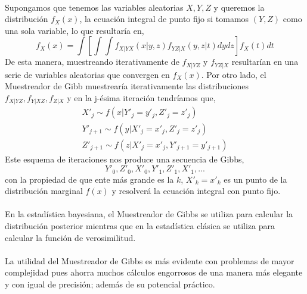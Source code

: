 \\
Supongamos que tenemos las variables aleatorias $X,Y,Z$ y queremos la distribuci\'on $f_X(x)$, la ecuaci\'on integral de punto fijo si tomamos $(Y,Z)$ como una sola variable, lo que resultar\'ia en,\\
\[f_X(x)= \int [ \int \int f_{X|YX}(x|y,z)f_{YZ|X}(y,z|t)dy dz] f_X(t) dt\]
De esta manera, muestreando iterativamente de $f_{X|YZ}$ y $f_{YZ|X}$ resultar\'ian en una serie de variables aleatorias que convergen en $f_X(x)$. Por otro lado, el Muestreador de Gibb muestrear\'ia iterativamente las distribuciones $f_{X|YZ}, f_{Y|XZ}, f_{Z|X}$ y en la j-\'esima iteraci\'on tendr\'iamos que,\\
\begin{align*}
X'_j \sim f(x|Y'_j = y'_j, Z'_j=z'_j)\\
Y'_{j+1} \sim f(y|X'_j=x'_j, Z'_j=z'_j)\\
Z'_{j+1} \sim f(z|X'_j=x'_j, Y'_{j+1}=y'_{j+1})
\end{align*}
Este esquema de iteraciones nos produce una secuencia de Gibbs,\\
\[Y'_0,Z'_0,X'_0,Y'_1,Z'_1,X'_1,...\]
con la propiedad de que ente m\'as grande es la $k$, $X'_k=x'_k$ es un punto de la distribuci\'on marginal $f(x)$ y resolver\'a la ecuaci\'on integral con punto fijo.\\
\\
En la estad\'istica bayesiana, el Muestreador de Gibbs se utiliza para calcular la distribuci\'on posterior mientras que en la estad\'istica cl\'asica se utiliza para calcular la funci\'on de verosimilitud.\\
\\
La utilidad del Muestreador de Gibbs es m\'as evidente con problemas de mayor complejidad pues ahorra muchos c\'alculos engorrosos de una manera m\'as elegante y con igual de precisi\'on; adem\'as de su potencial pr\'actico.